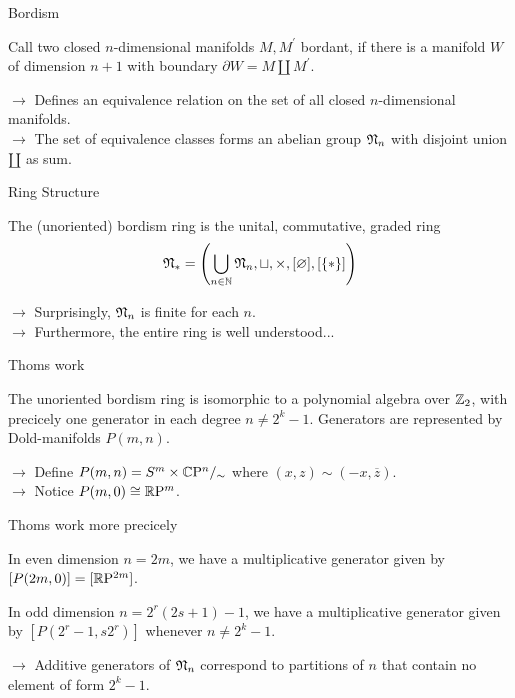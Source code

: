 \documentclass{presis}
\begin{document}
\begin{frame}{Bordism}
    \begin{defi}
        Call two closed $n$-dimensional manifolds $M,M^\prime$ bordant, if there is a manifold $W$ of dimension $n+1$ with boundary $\partial W = M \amalg M^\prime$.
    \end{defi}\pause
    $\rightarrow$ Defines an equivalence relation on the set of all closed $n$-dimensional manifolds.\pause \\
    $\rightarrow$ The set of equivalence classes forms an abelian group $\mathfrak{N}_n$ with disjoint union $\amalg$ as sum.
\end{frame}

\begin{frame}{Ring Structure}
    \begin{defi}
        The (unoriented) bordism ring is the unital, commutative, graded ring
        \begin{equation*}
            \mathfrak{N}_\ast = \left(\bigcup\limits_{n\in\mathbb{N}} \mathfrak{N}_n, \sqcup, \times, [\varnothing], [\{\ast\}]\right)
        \end{equation*}
    \end{defi}\pause
    $\rightarrow$ Surprisingly, $\mathfrak{N}_n$ is finite for each $n$.\pause \\
    $\rightarrow$ Furthermore, the entire ring is well understood...
\end{frame}

\begin{frame}{Thoms work}
    \begin{thm}
        The unoriented bordism ring is isomorphic to a polynomial algebra over $\mathbb{Z}_2$, with precicely one generator in each degree $n\neq 2^k - 1$.
        Generators are represented by Dold-manifolds $P(m,n)$.
    \end{thm}\pause
    $\rightarrow$ Define $P(m,n) = S^m\times\mathbb{C}\mathrm{P}^n /_\sim$ where $(x,z)\sim (-x,\overline{z})$.\pause \\
    $\rightarrow$ Notice $P(m,0) \cong \mathbb{R}\mathrm{P}^m$.
\end{frame}

\begin{frame}{Thoms work more precicely}
    \begin{vfilleditems}
    \item In even dimension $n = 2m$, we have a multiplicative generator given by $[P(2m,0)] = [\mathbb{R}\mathrm{P}^{2m}]$.\pause
    \item In odd dimension $n = 2^r(2s + 1) - 1$, we have a multiplicative generator given by $[P(2^r - 1, s2^r)]$ whenever $n\neq 2^k - 1$.\pause
    \end{vfilleditems}
    $\rightarrow$ Additive generators of $\mathfrak{N}_n$ correspond to partitions of $n$ that contain no element of form $2^k - 1$.
\end{frame}
\end{document}
